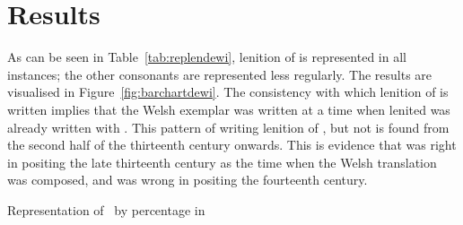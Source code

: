 \begin{mwl}
\end{mwl}


\section{Results}
\label{sec:results-1}
As can be seen in Table~\ref{tab:replendewi}, lenition of  is represented in all instances; the other consonants are represented less regularly. The results are visualised in Figure~\ref{fig:barchartdewi}. The consistency with which lenition of  is written implies that the Welsh exemplar was written at a time when lenited  was already written with . This pattern of writing lenition of , but not  is found from the second half of the thirteenth century onwards. This is evidence that \textcite{Rob_Ystoriaeu11} was right in positing the late thirteenth century as the time when the Welsh translation was composed, and \textcite{Eva_Welsh88} was wrong in positing the fourteenth century.


\begin{table}[h]
  \centering
  \caption{Representation of \lT\ by percentage in }
  \label{tab:replendewi}
  
\end{table} 

%   

